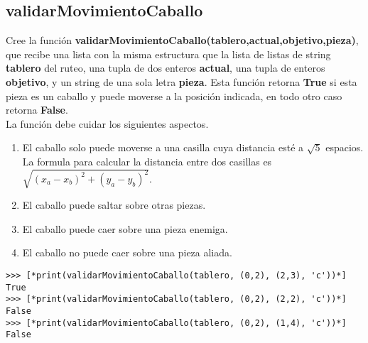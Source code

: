 \subsection*{validarMovimientoCaballo}

Cree la función \textbf{validarMovimientoCaballo(tablero,actual,objetivo,pieza)}, que recibe una lista con la misma estructura que la lista de listas de string \textbf{tablero} del ruteo, una tupla de dos enteros \textbf{actual}, una tupla de enteros \textbf{objetivo}, y un string de una sola letra \textbf{pieza}. Esta función retorna \textbf{True} si esta pieza es un caballo y puede moverse a la posición indicada, en todo otro caso retorna \textbf{False}. \\
La función debe cuidar los siguientes aspectos.
\begin{enumerate}
    \item El caballo solo puede moverse a una casilla cuya distancia esté a $\sqrt{5}$ espacios.\\
    La formula para calcular la distancia entre dos casillas es $\sqrt{(x_a-x_b)^2+(y_a-y_b)^2}$.
    \item El caballo puede saltar sobre otras piezas.
    \item El caballo puede caer sobre una pieza enemiga.
    \item El caballo no puede caer sobre una pieza aliada.
\end{enumerate}



\begin{lstlisting}[style=consola]
>>> [*print(validarMovimientoCaballo(tablero, (0,2), (2,3), 'c'))*]
True
>>> [*print(validarMovimientoCaballo(tablero, (0,2), (2,2), 'c'))*]
False
>>> [*print(validarMovimientoCaballo(tablero, (0,2), (1,4), 'c'))*]
False
\end{lstlisting}
